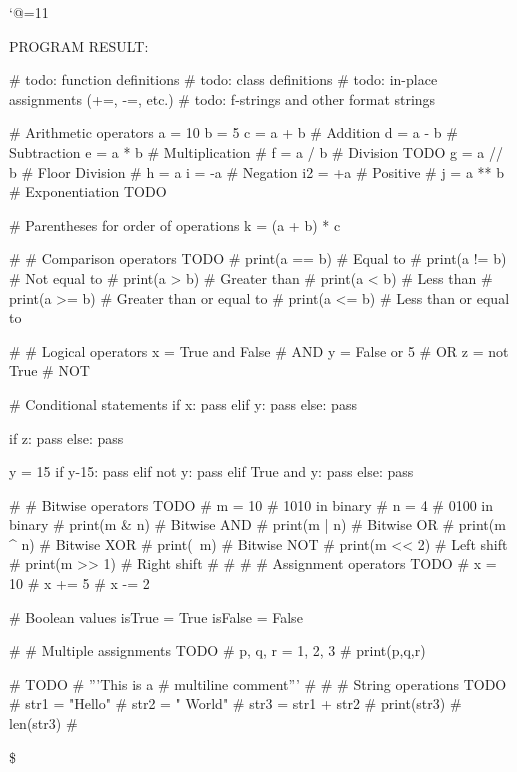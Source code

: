 \let\e\expandafter
\catcode`@=11

\def\@pytexError#1{%
	\errmessage{#1}%
}










\def\@pytexChar@Backslash{\loggingall\@pytexParser@parse}
\let\@pytexChar@Dollar\bye

\def\@pytexChar@DoubleQuote{\relax}
\def\@pytexChar@SingleQuote{\relax}


%

PROGRAM RESULT:

\@pytexCatcodes@setallactive

# todo: function definitions
# todo: class definitions
# todo: in-place assignments (+=, -=, etc.)
# todo: f-strings and other format strings


# Arithmetic operators
a = 10
b = 5
c = a + b  # Addition
d = a - b  # Subtraction
e = a * b  # Multiplication
# f = a / b  # Division TODO
g = a // b # Floor Division
# h = a %
i = -a     # Negation
i2 = +a    # Positive
# j = a ** b # Exponentiation TODO


# Parentheses for order of operations
k = (a + b) * c

# # Comparison operators TODO
# print(a == b)  # Equal to
# print(a != b)  # Not equal to
# print(a > b)   # Greater than
# print(a < b)   # Less than
# print(a >= b)  # Greater than or equal to
# print(a <= b)  # Less than or equal to


# # Logical operators
x = True and False  # AND
y = False or 5   # OR
z = not True        # NOT


# Conditional statements
if x:
    pass
elif y:
    pass
else:
    pass


if z:
    pass
else:
    pass

y = 15
if y-15:
    pass
elif not y:
	pass
elif True and y:
    pass
else:
    pass


# # Bitwise operators TODO
# m = 10  # 1010 in binary
# n = 4   # 0100 in binary
# print(m & n)  # Bitwise AND
# print(m | n)  # Bitwise OR
# print(m ^ n)  # Bitwise XOR
# print(~m)   # Bitwise NOT
# print(m << 2) # Left shift
# print(m >> 1) # Right shift
# 
# 
# # Assignment operators TODO
# x = 10
# x += 5
# x -= 2

# Boolean values
isTrue = True
isFalse = False

# # Multiple assignments TODO
# p, q, r = 1, 2, 3
# print(p,q,r)

# TODO
# '''This is a
# multiline comment'''
# 
# 
# String operations TODO
# str1 = "Hello"
# str2 = " World"
# str3 = str1 + str2
# print(str3)
# len(str3)
# 

\$
\bye
